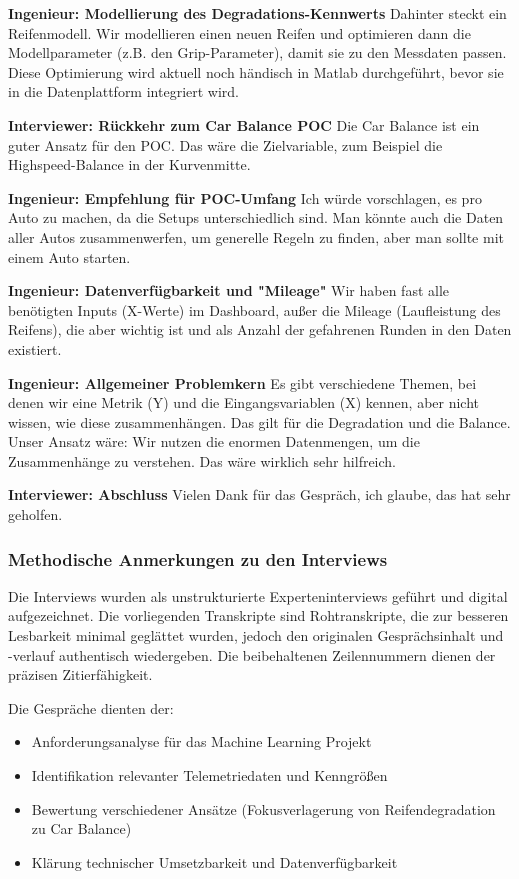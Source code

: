 \textbf{Ingenieur: Modellierung des Degradations-Kennwerts}
Dahinter steckt ein Reifenmodell. Wir modellieren einen neuen Reifen und optimieren dann die Modellparameter (z.B. den Grip-Parameter), damit sie zu den Messdaten passen. Diese Optimierung wird aktuell noch händisch in Matlab durchgeführt, bevor sie in die Datenplattform integriert wird.

\textbf{Interviewer: Rückkehr zum Car Balance POC}
Die Car Balance ist ein guter Ansatz für den POC. Das wäre die Zielvariable, zum Beispiel die Highspeed-Balance in der Kurvenmitte.

\textbf{Ingenieur: Empfehlung für POC-Umfang}
Ich würde vorschlagen, es pro Auto zu machen, da die Setups unterschiedlich sind. Man könnte auch die Daten aller Autos zusammenwerfen, um generelle Regeln zu finden, aber man sollte mit einem Auto starten.

\textbf{Ingenieur: Datenverfügbarkeit und "Mileage"}
Wir haben fast alle benötigten Inputs (X-Werte) im Dashboard, außer die Mileage (Laufleistung des Reifens), die aber wichtig ist und als Anzahl der gefahrenen Runden in den Daten existiert.

\textbf{Ingenieur: Allgemeiner Problemkern}
Es gibt verschiedene Themen, bei denen wir eine Metrik (Y) und die Eingangsvariablen (X) kennen, aber nicht wissen, wie diese zusammenhängen. Das gilt für die Degradation und die Balance. Unser Ansatz wäre: Wir nutzen die enormen Datenmengen, um die Zusammenhänge zu verstehen. Das wäre wirklich sehr hilfreich.

\textbf{Interviewer: Abschluss}
Vielen Dank für das Gespräch, ich glaube, das hat sehr geholfen.

\pagebreak
\nolinenumbers

\subsubsection{Methodische Anmerkungen zu den Interviews}

Die Interviews wurden als unstrukturierte Experteninterviews geführt und digital aufgezeichnet. Die vorliegenden Transkripte sind Rohtranskripte, die zur besseren Lesbarkeit minimal geglättet wurden, jedoch den originalen Gesprächsinhalt und -verlauf authentisch wiedergeben. Die beibehaltenen Zeilennummern dienen der präzisen Zitierfähigkeit.

Die Gespräche dienten der:
\begin{itemize}
 \item Anforderungsanalyse für das Machine Learning Projekt
 \item Identifikation relevanter Telemetriedaten und Kenngrößen
 \item Bewertung verschiedener Ansätze (Fokusverlagerung von Reifendegradation zu Car Balance)
 \item Klärung technischer Umsetzbarkeit und Datenverfügbarkeit
\end{itemize}